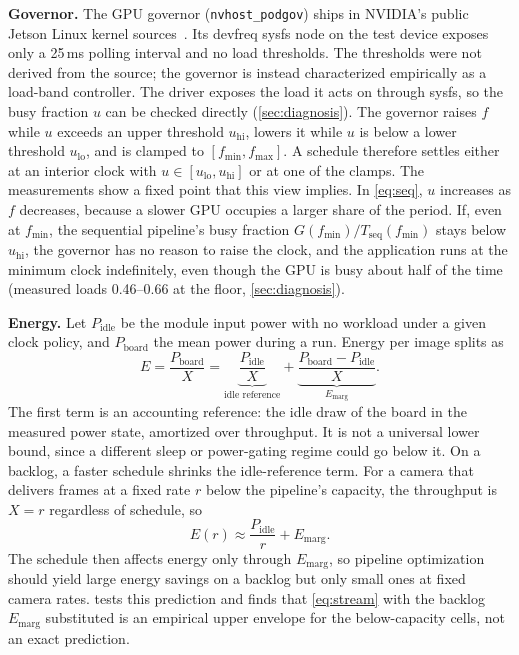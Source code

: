 \textbf{Governor.}
The GPU governor (\texttt{nvhost\_podgov}) ships in NVIDIA's public
Jetson Linux kernel sources~\cite{nvidia2025jetsonkernel}. Its devfreq
sysfs node on the test device exposes only a 25\,ms polling interval
and no load thresholds. The thresholds were not derived from the
source; the governor is instead characterized empirically as a
load-band controller. The driver exposes the load it acts on through
sysfs, so the busy fraction $u$ can be checked directly
(\cref{sec:diagnosis}). The governor raises $f$ while $u$ exceeds an
upper threshold $u_{\text{hi}}$, lowers it while $u$ is below a lower
threshold $u_{\text{lo}}$, and is clamped to $[f_{\min}, f_{\max}]$. A
schedule therefore settles either at an interior clock with
$u \in [u_{\text{lo}}, u_{\text{hi}}]$ or at one of the clamps. The
measurements show a fixed point that this view implies. In
\cref{eq:seq}, $u$ increases as $f$ decreases, because a slower GPU occupies a larger share of the
period. If, even at $f_{\min}$, the sequential pipeline's busy fraction
$G(f_{\min})/T_{\text{seq}}(f_{\min})$ stays below $u_{\text{hi}}$, the
governor has no reason to raise the clock, and the application runs at
the minimum clock indefinitely, even though the GPU is busy
about half of the time (measured loads 0.46--0.66 at the floor,
\cref{sec:diagnosis}).

\textbf{Energy.}
Let $P_{\text{idle}}$ be the module input power with no workload under a
given clock policy, and $P_{\text{board}}$ the mean power during a run.
Energy per image splits as
\begin{equation}
  E = \frac{P_{\text{board}}}{X}
    = \underbrace{\frac{P_{\text{idle}}}{X}}_{\text{idle reference}}
    + \underbrace{\frac{P_{\text{board}} - P_{\text{idle}}}{X}}_{E_{\text{marg}}}.
  \label{eq:energy}
\end{equation}
The first term is an accounting reference: the idle draw of the board
in the measured power state, amortized over throughput. It is not a
universal lower bound, since a different sleep or power-gating regime
could go below it. On a backlog, a faster schedule shrinks the
idle-reference term. For a camera that delivers frames at a fixed rate
$r$ below the pipeline's capacity, the throughput is $X = r$ regardless
of schedule, so
\begin{equation}
  E(r) \approx \frac{P_{\text{idle}}}{r} + E_{\text{marg}}.
  \label{eq:stream}
\end{equation}
The schedule then affects energy only through $E_{\text{marg}}$, so
pipeline optimization should yield large energy savings on a backlog
but only small ones at fixed camera rates.  tests
this prediction and finds that \cref{eq:stream} with the backlog $E_{\text{marg}}$ substituted is an
empirical upper envelope for the below-capacity cells, not an exact
prediction.
